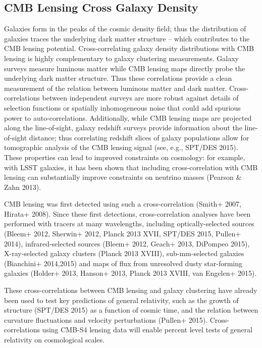 \subsection{CMB Lensing Cross Galaxy Density}
Galaxies form in the peaks of the cosmic density field; thus the distribution of galaxies traces the underlying dark matter structure -- which contributes to the CMB lensing potential.
Cross-correlating galaxy density distributions with CMB lensing is highly complementary to galaxy clustering measurements.
Galaxy surveys measure luminous matter while CMB lensing maps directly probe the underlying dark matter structure. Thus these correlations provide a clean measurement of the relation between luminous matter and dark matter.
Cross-correlations between independent surveys are more robust against details of selection functions or spatially inhomogeneous noise that could add spurious power to auto-correlations.
Additionally, while CMB lensing maps are projected along the line-of-sight, galaxy redshift surveys provide information about the line-of-sight distance; thus correlating redshift slices of galaxy populations allow for tomographic analysis of the CMB lensing signal (see, e.g., SPT/DES 2015).
These properties can lead to improved constraints on cosmology: for example, with LSST galaxies, it has been shown that including cross-correlation with CMB lensing can substantially improve constraints on neutrino masses (Pearson \& Zahn 2013).


CMB lensing was first detected using such a cross-correlation (Smith+ 2007, Hirata+ 2008).  Since these first detections, cross-correlation analyses have been performed with tracers at many wavelengths, including optically-selected sources (Bleem+ 2012, Sherwin+ 2012, Planck 2013 XVII, SPT/DES 2015, Pullen+ 2014), infrared-selected sources (Bleem+ 2012, Geach+ 2013, DiPompeo 2015), X-ray-selected galaxy clusters (Planck 2013 XVIII), sub-mm-selected galaxies (Bianchini+ 2014,2015) and maps of flux from unresolved dusty star-forming galaxies (Holder+ 2013, Hanson+ 2013, Planck 2013 XVIII, van Engelen+ 2015). 

These cross-correlations between CMB lensing and galaxy clustering have already been used to test key predictions of general relativity, such as the growth of structure (SPT/DES 2015) as a function of cosmic time, and the relation between curvature fluctuations and velocity perturbations (Pullen+ 2015). Cross-correlations using CMB-S4 lensing data will enable 
percent level tests of general relativity on cosmological scales.

